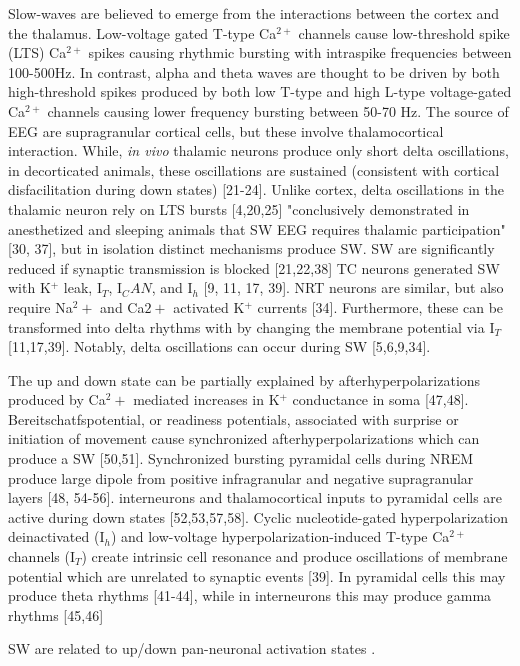 Slow-waves are believed to emerge from the interactions between the cortex and the thalamus.
Low-voltage gated T-type Ca$^{2+}$ channels cause low-threshold spike (LTS) Ca$^{2+}$ spikes causing rhythmic bursting with intraspike frequencies between 100-500Hz. 
In contrast, alpha and theta waves are thought to be driven by both high-threshold spikes produced by both low T-type and high L-type voltage-gated Ca$^{2+}$ channels causing lower frequency bursting between 50-70 Hz.
The source of EEG are supragranular cortical cells, but these involve thalamocortical interaction.
While, \textit{in vivo} thalamic neurons produce only short delta oscillations, in decorticated animals, these oscillations are sustained (consistent with cortical disfacilitation during down states) [21-24].
Unlike cortex, delta oscillations in the thalamic neuron rely on LTS bursts [4,20,25]
"conclusively demonstrated in anesthetized and sleeping animals that SW EEG requires thalamic participation" [30, 37], but in isolation distinct mechanisms produce SW.
SW are significantly reduced if synaptic transmission is blocked [21,22,38]
TC neurons generated SW with K$^+$ leak, I$_T$, I$_CAN$, and I$_h$ [9, 11, 17, 39]. NRT neurons are similar, but also require Na$^2+$ and Ca$2+$ activated K$^+$ currents [34]. Furthermore, these can be transformed into delta rhythms with by changing the membrane potential via I$_T$ [11,17,39]. Notably, delta oscillations can occur during SW [5,6,9,34].

\citep{Crunelli2018} 

The up and down state can be partially explained by afterhyperpolarizations produced by Ca$^2+$ mediated increases in K$^+$ conductance in soma [47,48].
Bereitschatfspotential, or readiness potentials, associated with surprise or initiation of movement cause synchronized afterhyperpolarizations which can produce a SW [50,51].
Synchronized bursting pyramidal cells during NREM produce large dipole from positive infragranular and negative supragranular layers [48, 54-56].
interneurons and thalamocortical inputs to pyramidal cells are active during down states [52,53,57,58]. 
Cyclic nucleotide-gated hyperpolarization deinactivated (I$_h$) and low-voltage hyperpolarization-induced T-type Ca$^{2+}$ channels (I$_T$) create intrinsic cell resonance and produce oscillations of membrane potential which are unrelated to synaptic events [39]. In pyramidal cells this may produce theta rhythms [41-44], while in interneurons this may produce gamma rhythms [45,46]
\citep{Buzsaki2012}

SW are related to up/down pan-neuronal activation states
\citep{Steriade2001}.

